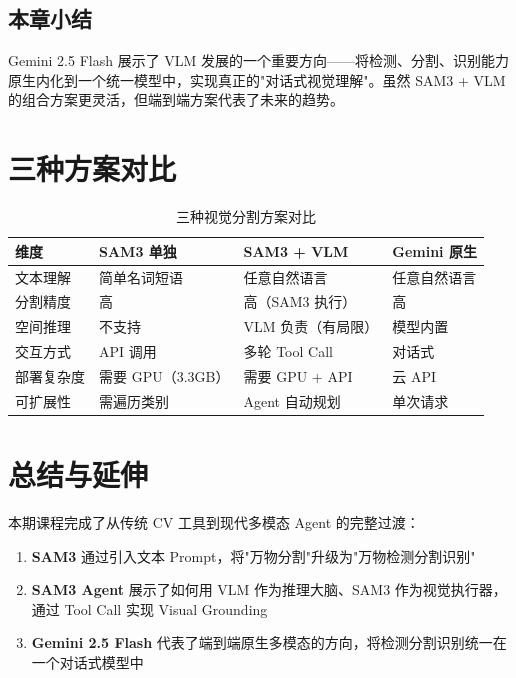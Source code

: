 \documentclass[a4paper]{article}
\begin{document}
\subsection{本章小结}

Gemini 2.5 Flash 展示了 VLM 发展的一个重要方向——将检测、分割、识别能力原生内化到一个统一模型中，实现真正的"对话式视觉理解"。虽然 SAM3 + VLM 的组合方案更灵活，但端到端方案代表了未来的趋势。


\section{三种方案对比}

\begin{table}[H]
\centering
\begin{tabular}{p{3cm}p{3.5cm}p{3.5cm}p{3.5cm}}
\toprule
\textbf{维度} & \textbf{SAM3 单独} & \textbf{SAM3 + VLM} & \textbf{Gemini 原生} \\
\midrule
文本理解 & 简单名词短语 & 任意自然语言 & 任意自然语言 \\
分割精度 & 高 & 高（SAM3 执行） & 高 \\
空间推理 & 不支持 & VLM 负责（有局限） & 模型内置 \\
交互方式 & API 调用 & 多轮 Tool Call & 对话式 \\
部署复杂度 & 需要 GPU（3.3GB） & 需要 GPU + API & 云 API \\
可扩展性 & 需遍历类别 & Agent 自动规划 & 单次请求 \\
\bottomrule
\end{tabular}
\caption{三种视觉分割方案对比}
\end{table}


\section{总结与延伸}

本期课程完成了从传统 CV 工具到现代多模态 Agent 的完整过渡：

\begin{enumerate}
    \item \textbf{SAM3} 通过引入文本 Prompt，将"万物分割"升级为"万物检测分割识别"
    \item \textbf{SAM3 Agent} 展示了如何用 VLM 作为推理大脑、SAM3 作为视觉执行器，通过 Tool Call 实现 Visual Grounding
    \item \textbf{Gemini 2.5 Flash} 代表了端到端原生多模态的方向，将检测分割识别统一在一个对话式模型中
\end{enumerate}
\end{document}
